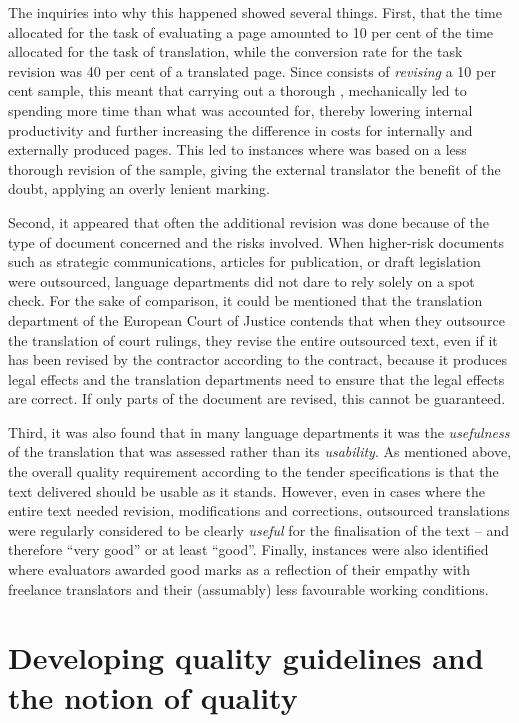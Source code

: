 \documentclass[output=paper]{langsci/langscibook}
\begin{document}
The inquiries into why this happened showed several things. First, that the time allocated for the task of evaluating a page amounted to 10 per cent of the time allocated for the task of translation, while the conversion rate for the task revision was 40 per cent of a translated page. Since  consists of \textit{revising} a 10 per cent sample, this meant that carrying out a thorough , mechanically led to spending more time than what was accounted for, thereby lowering internal productivity and further increasing the difference in costs for internally and externally produced pages. This led to instances where  was based on a less thorough revision of the sample, giving the external translator the benefit of the doubt, applying an overly lenient marking.

Second, it appeared that often the additional revision was done because of the type of document concerned and the risks involved. When higher-risk documents such as strategic communications, articles for publication, or draft legislation were outsourced, language departments did not dare to rely solely on a spot check. For the sake of comparison, it could be mentioned that the translation department of the European Court of Justice contends that when they outsource the translation of court rulings, they revise the entire outsourced text, even if it has been revised by the contractor according to the contract, because it produces legal effects and the translation departments need to ensure that the legal effects are correct. If only parts of the document are revised, this cannot be guaranteed. 

Third, it was also found that in many language departments it was the \textit{usefulness} of the translation that was assessed rather than its \textit{usability}. As mentioned above, the overall quality requirement according to the tender specifications is that the text delivered should be usable as it stands. However, even in cases where the entire text needed revision, modifications and corrections, outsourced translations were regularly considered to be clearly \textit{useful} for the finalisation of the text – and therefore ``very good'' or at least ``good''. Finally, instances were also identified where evaluators awarded good marks as a reflection of their empathy with freelance translators and their (assumably) less favourable working conditions.

\section{Developing quality guidelines and the notion of quality}\label{sec:strandvik:strandvic:4}
\end{document}
